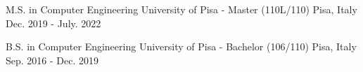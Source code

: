 

\begin{cventries}

  \educationentry
    {M.S. in Computer Engineering} %
    {University of Pisa - Master (110L/110)} %
    {Pisa, Italy} %
    {Dec. 2019 - July. 2022} %

 \educationentry
    {B.S. in Computer Engineering} %
    {University of Pisa - Bachelor (106/110)} %
    {Pisa, Italy} %
    {Sep. 2016 - Dec. 2019} %
\end{cventries}
